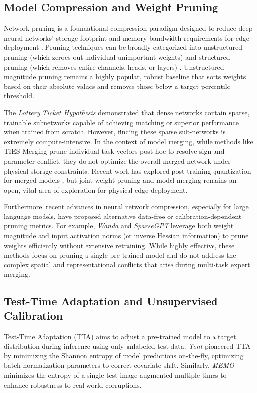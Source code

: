 \subsection{Model Compression and Weight Pruning}
Network pruning is a foundational compression paradigm designed to reduce deep neural networks' storage footprint and memory bandwidth requirements for edge deployment \cite{han2015learning}. Pruning techniques can be broadly categorized into unstructured pruning (which zeroes out individual unimportant weights) and structured pruning (which removes entire channels, heads, or layers) \cite{li2016pruning,he2017channel}. Unstructured magnitude pruning \cite{han2015learning} remains a highly popular, robust baseline that sorts weights based on their absolute values and removes those below a target percentile threshold. 

The \emph{Lottery Ticket Hypothesis} \cite{frankle2018lottery,chen2020lottery} demonstrated that dense networks contain sparse, trainable subnetworks capable of achieving matching or superior performance when trained from scratch. However, finding these sparse sub-networks is extremely compute-intensive. In the context of model merging, while methods like TIES-Merging \cite{yadav2023ties} prune individual task vectors post-hoc to resolve sign and parameter conflict, they do not optimize the overall merged network under physical storage constraints. Recent work has explored post-training quantization for merged models \cite{detettori2023pruning}, but joint weight-pruning and model merging remains an open, vital area of exploration for physical edge deployment.

Furthermore, recent advances in neural network compression, especially for large language models, have proposed alternative data-free or calibration-dependent pruning metrics. For example, \emph{Wanda} \cite{sun2023wanda} and \emph{SparseGPT} \cite{frantar2023sparsegpt} leverage both weight magnitude and input activation norms (or inverse Hessian information) to prune weights efficiently without extensive retraining. While highly effective, these methods focus on pruning a single pre-trained model and do not address the complex spatial and representational conflicts that arise during multi-task expert merging.

\subsection{Test-Time Adaptation and Unsupervised Calibration}
Test-Time Adaptation (TTA) aims to adjust a pre-trained model to a target distribution during inference using only unlabeled test data. \emph{Tent} \cite{wang2020tent} pioneered TTA by minimizing the Shannon entropy of model predictions on-the-fly, optimizing batch normalization parameters to correct covariate shift. Similarly, \emph{MEMO} \cite{zhang2022memo} minimizes the entropy of a single test image augmented multiple times to enhance robustness to real-world corruptions. 

